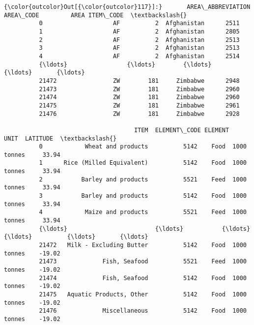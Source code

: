 \documentclass[11pt]{article}
\begin{document}
\begin{Verbatim}[commandchars=\\\{\}]
{\color{outcolor}Out[{\color{outcolor}117}]:}       AREA\_ABBREVIATION  AREA\_CODE         AREA ITEM\_CODE  \textbackslash{}
          0                    AF          2  Afghanistan      2511   
          1                    AF          2  Afghanistan      2805   
          2                    AF          2  Afghanistan      2513   
          3                    AF          2  Afghanistan      2513   
          4                    AF          2  Afghanistan      2514   
          {\ldots}                 {\ldots}        {\ldots}          {\ldots}       {\ldots}   
          21472                ZW        181     Zimbabwe      2948   
          21473                ZW        181     Zimbabwe      2960   
          21474                ZW        181     Zimbabwe      2960   
          21475                ZW        181     Zimbabwe      2961   
          21476                ZW        181     Zimbabwe      2928   
          
                                     ITEM  ELEMENT\_CODE ELEMENT         UNIT  LATITUDE  \textbackslash{}
          0            Wheat and products          5142    Food  1000 tonnes     33.94   
          1      Rice (Milled Equivalent)          5142    Food  1000 tonnes     33.94   
          2           Barley and products          5521    Feed  1000 tonnes     33.94   
          3           Barley and products          5142    Food  1000 tonnes     33.94   
          4            Maize and products          5521    Feed  1000 tonnes     33.94   
          {\ldots}                         {\ldots}           {\ldots}     {\ldots}          {\ldots}       {\ldots}   
          21472   Milk - Excluding Butter          5142    Food  1000 tonnes    -19.02   
          21473             Fish, Seafood          5521    Feed  1000 tonnes    -19.02   
          21474             Fish, Seafood          5142    Food  1000 tonnes    -19.02   
          21475   Aquatic Products, Other          5142    Food  1000 tonnes    -19.02   
          21476             Miscellaneous          5142    Food  1000 tonnes    -19.02   
          

\end{Verbatim}
\end{document}
